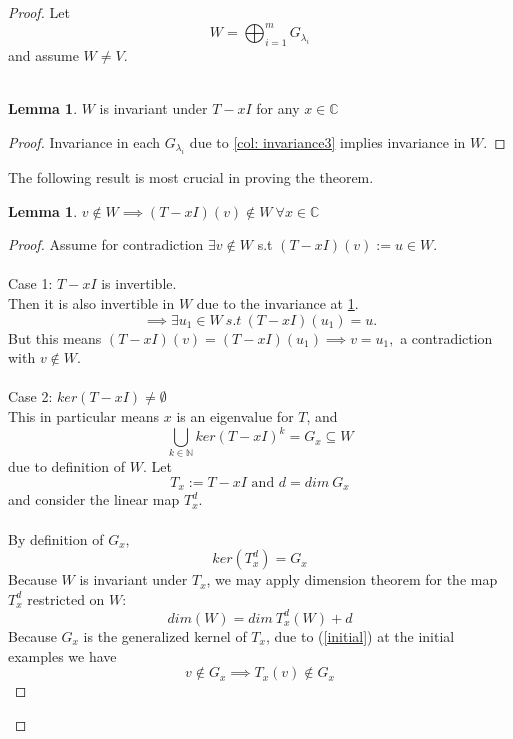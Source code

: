 \documentclass{article}
\theoremstyle{definition}
\newtheorem{lemma}[theorem]{Lemma}
\begin{document}
    \begin{proof}
         Let $$W=\bigoplus_{i=1}^m G_{\lambda_i}$$and assume $W\neq V$.\\ \\
\begin{lemma}\label{lem:Winv}
    $W$ is invariant under $T-xI$ for any $x\in\mathbb{C}$
\end{lemma} 

\begin{proof}
    Invariance in each $G_{\lambda_i}$ due to \ref{col: invariance3} implies invariance in $W$.
\end{proof} 

The following result is most crucial in proving the theorem.
\begin{lemma}\label{lem:important}
    $v\notin W \implies (T-xI)(v)\notin W \ \forall x\in \mathbb{C}$
\end{lemma} 
\begin{proof}
    Assume for contradiction $\exists v\notin W$ s.t $(T-xI)
(v):=u\in W$.\\ \\
Case 1: $T-xI$ is invertible.\\
Then it is also invertible in $W$ due to the invariance at \ref{lem:Winv}. $$\implies \exists u_1 \in W \ s.t\ (T-xI)(u_1)=u.$$
But this means $(T-xI)(v)=(T-xI)(u_1)\implies v=u_1,$ a contradiction with $v \notin W$.\\ \\
Case 2: $ker (T-xI)\neq \emptyset$\\
This in particular means $x$ is an eigenvalue for $T$, and $$\bigcup_{k\in \mathbb{N}} ker(T-xI)^k=G_x\subseteq W$$due to definition of $W$.
Let $$T_x:=T-xI \text{ and } d=dim\ G_x$$and consider the linear map $T_x^d$.\\\\
By definition of $G_x,$ $$ker(T_x^d)=G_x$$
Because $W$ is invariant under $T_x$, we may apply
dimension theorem for the map $T_x^d$ restricted on $W$:
\begin{equation}
    \label{eq:dimW}
    dim(W)=dim\ T_x^d(W) +d
\end{equation}
Because $G_x$ is the generalized kernel of $T_x$, due to (\ref{initial}) at the initial examples we have 
\begin{equation}
    \label{eq:exclusion}
    v\notin G_x \implies T_x(v)\notin G_x
\end{equation}


\end{proof}
\end{proof}
\end{document}
